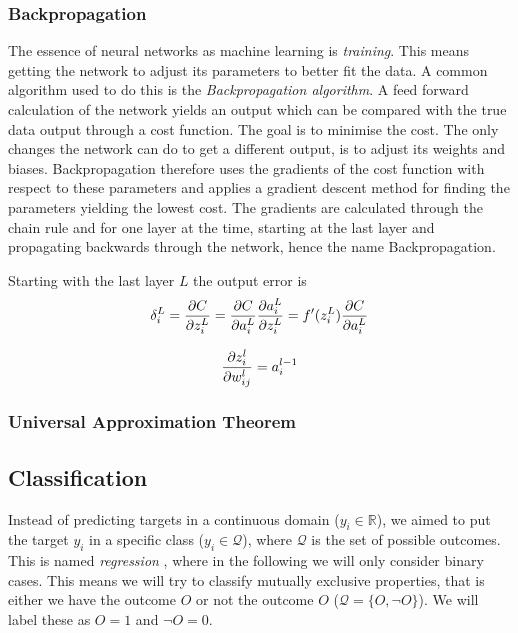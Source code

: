         \subsubsection{Backpropagation}
            The essence of neural networks as machine learning is \textit{training}. This means getting the network to adjust its parameters to better fit the data. A common algorithm used to do this is the \textit{Backpropagation algorithm}. A feed forward calculation of the network yields an output which can be compared with the true data output through a cost function. The goal is to minimise the cost. The only changes the network can do to get a different output, is to adjust its weights and biases. Backpropagation therefore uses the gradients of the cost function with respect to these parameters and applies a gradient descent method for finding the parameters yielding the lowest cost. The gradients are calculated through the chain rule and for one layer at the time, starting at the last layer and propagating backwards through the network, hence the name Backpropagation. 

            Starting with the last layer $L$ the output error is 
            \begin{equation}
                \delta_i^L = \pdv{C}{z_i^L} = \pdv{C}{a_i^L} \pdv{a_i^L}{z_i^L} =  f'(z_i^L) \pdv{C}{a_i^L}
            \end{equation}


            \begin{equation}
                \pdv{z^l_i}{w_{ij}^l} = a_i^{l-1}
            \end{equation}



    \subsubsection{Universal Approximation Theorem}

\subsection{Classification}
    Instead of predicting targets in a continuous domain ($y_i \in \mathbb{R}$), we aimed to put the target $y_i$ in a specific class ($y_i \in \mathcal{Q}$), where $\mathcal{Q}$ is the set of possible outcomes. This is named \textit{regression} , where in the following we will only consider binary cases. This means we will try to classify mutually exclusive properties, that is either we have the outcome $O$ or not the outcome $O$ ($\mathcal{Q} = \{O, \neg O\}$). We will label these as $O = 1$ and $\neg O = 0$.

